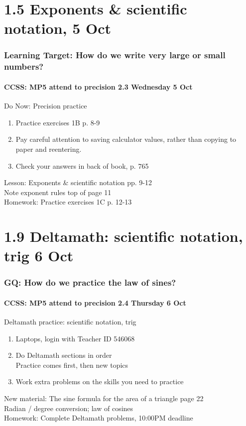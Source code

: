 \documentclass{beamer}
\begin{document}
  \section{1.5 Exponents \& scientific notation, 5 Oct}
  \frame
  {
    \frametitle{Learning Target: How do we write very large or small numbers?}
    \framesubtitle{CCSS: MP5 attend to precision \hfill \alert{2.3 Wednesday 5 Oct}}

    \begin{block}{Do Now: Precision practice}
    \begin{enumerate}
        \item Practice exercises 1B p. 8-9
        \item Pay careful attention to saving calculator values, rather than copying to paper and reentering.
        \item Check your answers in back of book, p. 765
    \end{enumerate}
    \end{block}
    Lesson: Exponents \& scientific notation pp. 9-12\\ \smallskip
    Note exponent rules top of page 11\\ \smallskip
    Homework: Practice exercises 1C p. 12-13
  }

  \section{1.9 Deltamath: scientific notation, trig 6 Oct}
  \frame
  {
    \frametitle{GQ: How do we practice the law of sines?}
    \framesubtitle{CCSS: MP5 attend to precision \hfill \alert{2.4 Thursday 6 Oct}}

    \begin{block}{Deltamath practice: scientific notation, trig}
      \begin{enumerate}
        \item Laptops, login with Teacher ID \alert{546068}
        \item Do Deltamath sections in order \\
        Practice comes first, then new topics
        \item Work extra problems on the skills you need to practice
    \end{enumerate}
    \end{block}
    New material: The sine formula for the area of a triangle page 22\\
    Radian / degree conversion; law of cosines\\ \smallskip
    Homework: Complete Deltamath problems, 10:00PM deadline
  }
\end{document}
